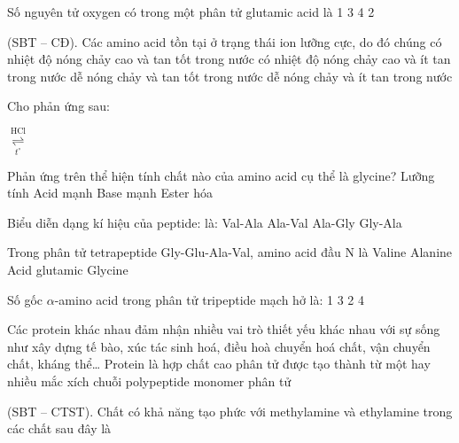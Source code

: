 \documentclass[11pt,a4paper]{article}
\def\loigiai#1{}
\begin{document}
\begin{ex}
Số nguyên tử oxygen có trong một phân tử glutamic acid là
\choice
{1}
{3}
{4}
{2}
\loigiai{}
\end{ex}

\begin{ex}
(SBT -- CĐ). Các amino acid tồn tại ở trạng thái ion lưỡng cực, do đó chúng
\choice
{có nhiệt độ nóng chảy cao và tan tốt trong nước}
{có nhiệt độ nóng chảy cao và ít tan trong nước}
{dễ nóng chảy và tan tốt trong nước}
{dễ nóng chảy và ít tan trong nước}
\loigiai{}
\end{ex}

\begin{ex}
Cho phản ứng sau:
\centerline{ $\underset{t^\circ}{\overset{\text{HCl}}{\rightleftharpoons}}$ }\par
Phản ứng trên thể hiện tính chất nào của amino acid cụ thể là glycine?
\choice
{Lưỡng tính}
{Acid mạnh}
{Base mạnh}
{Ester hóa}
\loigiai{}
\end{ex}

\begin{ex}
Biểu diễn dạng kí hiệu của peptide:  là:
\choice
{Val-Ala}
{Ala-Val}
{Ala-Gly}
{Gly-Ala}
\loigiai{}
\end{ex}

\begin{ex}
Trong phân tử tetrapeptide Gly-Glu-Ala-Val, amino acid đầu N là
\choice
{Valine}
{Alanine}
{Acid glutamic}
{Glycine}
\loigiai{}
\end{ex}

\begin{ex}
Số gốc $\alpha$-amino acid trong phân tử tripeptide mạch hở là:
\choice
{1}
{3}
{2}
{4}
\loigiai{}
\end{ex}

\begin{ex}
Các protein khác nhau đảm nhận nhiều vai trò thiết yếu khác nhau với sự sống như xây dựng tế bào, xúc tác sinh hoá, điều hoà chuyển hoá chất, vận chuyển chất, kháng thể\dots{} Protein là hợp chất cao phân tử được tạo thành từ một hay nhiều
\choice
{mắc xích}
{chuỗi polypeptide}
{monomer}
{phân tử}
\loigiai{}
\end{ex}

\newpage

\begin{ex}
(SBT -- CTST). Chất có khả năng tạo phức với methylamine và ethylamine trong các chất sau đây là
\choice
{}
{}
{}
{}
\loigiai{}
\end{ex}
\end{document}
